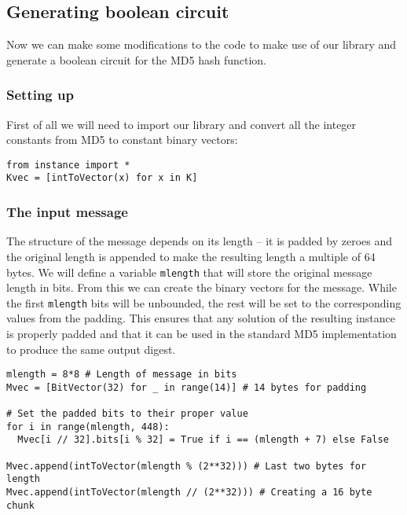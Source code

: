 \subsection{Generating boolean circuit}
Now we can make some modifications to the code to make use of our library and generate a boolean circuit for the MD5 hash function.

\subsubsection{Setting up}
First of all we will need to import our library and convert all the integer constants from MD5 to constant binary vectors:
\begin{verbatim}
from instance import *
Kvec = [intToVector(x) for x in K]
\end{verbatim}

\subsubsection{The input message}
The structure of the message depends on its length -- it is padded by zeroes and the original length is appended to make the resulting length a multiple of 64 bytes.
We will define a variable \texttt{mlength} that will store the original message length in bits.
From this we can create the binary vectors for the message.
While the first \texttt{mlength} bits will be unbounded, the rest will be set to the corresponding values from the padding.
This ensures that any solution of the resulting instance is properly padded and that it can be used in the standard MD5 implementation to produce the same output digest.

\begin{verbatim}
mlength = 8*8 # Length of message in bits               
Mvec = [BitVector(32) for _ in range(14)] # 14 bytes for padding

# Set the padded bits to their proper value
for i in range(mlength, 448):
  Mvec[i // 32].bits[i % 32] = True if i == (mlength + 7) else False

Mvec.append(intToVector(mlength % (2**32))) # Last two bytes for length
Mvec.append(intToVector(mlength // (2**32))) # Creating a 16 byte chunk
\end{verbatim}

